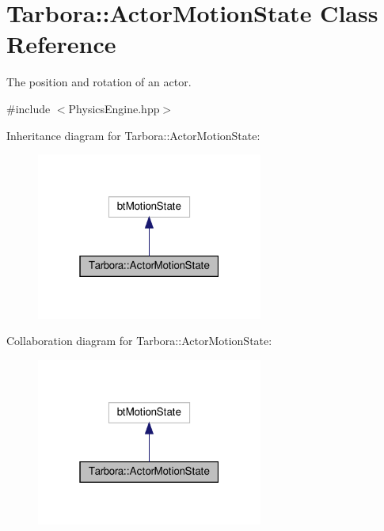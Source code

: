 \hypertarget{classTarbora_1_1ActorMotionState}{}\section{Tarbora\+:\+:Actor\+Motion\+State Class Reference}
\label{classTarbora_1_1ActorMotionState}


The position and rotation of an actor.  




{\ttfamily \#include $<$Physics\+Engine.\+hpp$>$}



Inheritance diagram for Tarbora\+:\+:Actor\+Motion\+State\+:\nopagebreak
\begin{figure}[H]
\begin{center}
\leavevmode
\includegraphics[width=211pt]{classTarbora_1_1ActorMotionState__inherit__graph}
\end{center}
\end{figure}


Collaboration diagram for Tarbora\+:\+:Actor\+Motion\+State\+:\nopagebreak
\begin{figure}[H]
\begin{center}
\leavevmode
\includegraphics[width=211pt]{classTarbora_1_1ActorMotionState__coll__graph}
\end{center}
\end{figure}
